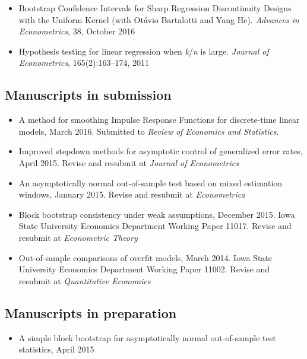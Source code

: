 \documentclass[12pt]{article}%
\begin{document}
\begin{itemize}
\item Bootstrap Confidence Intervals for Sharp Regression
Discontinuity Designs with the Uniform Kernel (with Ot\'avio Bartalotti
and Yang He). \textit{Advances in Econometrics}, 38, October 2016
\item Hypothesis testing for linear regression when
\textit{k}/\textit{n} is large. \textit{Journal of Econometrics},
165(2):163--174, 2011
\end{itemize}

\subsection*{Manuscripts in submission}

\begin{itemize}
\item A method for smoothing Impulse Response Functions for
  discrete-time linear models, March 2016. Submitted to
  \textit{Review of Economics and Statistics}.
\item Improved stepdown methods for asymptotic control of generalized
error rates, April 2015. Revise and resubmit at \textit{Journal of
Econometrics}
\item An asymptotically normal out-of-sample test based on mixed
estimation windows, January 2015. Revise and resubmit at
\textit{Econometrica}
\item Block bootstrap consistency under weak assumptions, December
2015.  Iowa State University Economics Department Working Paper
11017. Revise and resubmit at \textit{Econometric Theory}
\item Out-of-sample comparisons of overfit models, March 2014. Iowa
State University Economics Department Working Paper 11002. Revise and
resubmit at \textit{Quantitative Economics}
\end{itemize}

\subsection*{Manuscripts in preparation}
\begin{itemize}
\item A simple block bootstrap for asymptotically normal out-of-sample
  test statistics, April 2015
\end{itemize}
\end{document}
